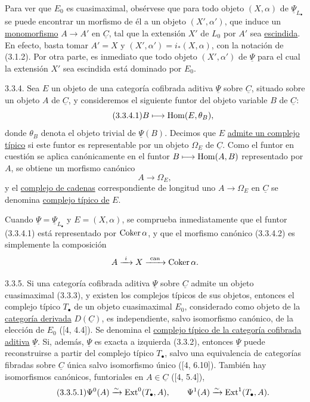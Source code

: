 Para ver que $E_0$ es cuasimaximal, obsérvese que para todo objeto
$(X,\alpha)$ de $\underline\Psi_{L_\bullet}$ se puede encontrar un
morfismo de él a un objeto $(X',\alpha')$, que induce un
\underline{monomorfismo} $A\longrightarrow A'$ en $\underline C$,
tal que la extensión $X'$ de $L_0$ por $A'$ sea
\underline{escindida}. En efecto, basta tomar $A'=X$ y
$(X',\alpha')=i_*(X,\alpha)$, con la notación de (3.1.2). Por otra
parte, es inmediato que todo objeto $(X',\alpha')$ de
$\underline\Psi$ para el cual la extensión $X'$ sea escindida está
dominado por $E_0$.

3.3.4. Sea $E$ un objeto de una categoría cofibrada aditiva
$\underline\Psi$ sobre $\underline C$, situado sobre un objeto $A$ de
$\underline C$, y consideremos el siguiente funtor del objeto variable
$B$ de $\underline C$:
\begin{equation}\tag{3.3.4.1}
 B\longmapsto\Hom(E,\theta_B),
\end{equation}
donde $\theta_B$ denota el objeto trivial de $\underline\Psi(B)$.
Decimos que $E$ \underline{admite un complejo típico} si este funtor
es representable por un objeto $\Omega_E$ de $\underline C$. Como el
funtor en cuestión se aplica canónicamente en el funtor
$B\longmapsto\Hom(A,B)$ representado por $A$, se obtiene un morfismo
canónico
\begin{equation}\tag{3.3.4.2}
 A\longrightarrow\Omega_E,
\end{equation}
y el \underline{complejo de cadenas} correspondiente de longitud uno
$A\longrightarrow\Omega_E$ en $\underline C$ se denomina
\underline{complejo típico de} $E$.

Cuando $\underline\Psi=\underline\Psi_{L_\bullet}$ y
$E=(X,\alpha)$, se comprueba inmediatamente que el funtor (3.3.4.1)
está representado por $\Coker\alpha$, y que el morfismo canónico
(3.3.4.2) es simplemente la composición
\[
 A\xrightarrow{\ \sisi{j}{i}\ }X
 \xrightarrow{\ \mathrm{can}\ }\Coker\alpha.
\]

3.3.5. Si una categoría cofibrada aditiva $\underline\Psi$ sobre
$\underline C$ admite un objeto cuasimaximal (3.3.3), y existen los
complejos típicos de sus objetos, entonces el complejo típico
$T_\bullet$ de un objeto cuasimaximal $E_0$, considerado como objeto de
la \underline{categoría derivada} $D(\underline C)$, es independiente,
salvo isomorfismo canónico, de la elección de $E_0$ ([4, 4.4]). Se
denomina el \underline{complejo típico de la categoría cofibrada
aditiva} $\underline\Psi$. Si, además, $\underline\Psi$ es exacta a
izquierda (3.3.2), entonces $\underline\Psi$ puede reconstruirse a
partir del complejo típico $T_\bullet$, salvo una equivalencia de
categorías fibradas sobre $\underline C$ única salvo isomorfismo único
([4, 6.10]). También hay isomorfismos canónicos, funtoriales en
$A\in\underline C$ ([4, 5.4]),
\begin{equation}\tag{3.3.5.1}
 \Psi^0(A)\xrightarrow{\sim}\Ext^0(T_\bullet,A),
 \qquad
 \Psi^1(A)\xrightarrow{\sim}\Ext^1(T_\bullet,A).
\end{equation}

